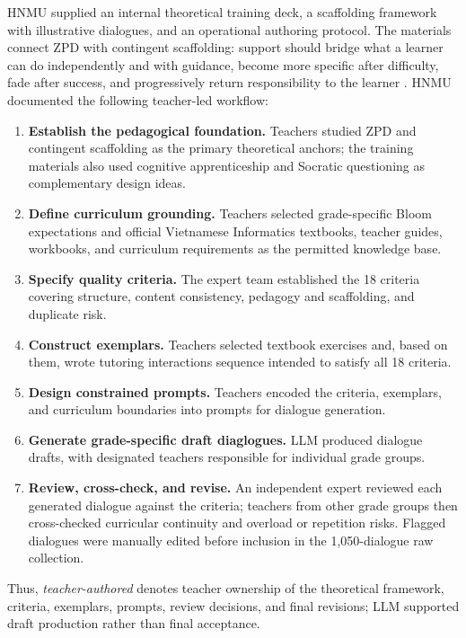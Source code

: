 \documentclass[conference]{IEEEtran}
\begin{document}
HNMU supplied an internal theoretical training deck, a scaffolding framework
with illustrative dialogues, and an operational authoring protocol. The
materials connect ZPD with contingent scaffolding: support should bridge what
a learner can do independently and with guidance, become more specific after
difficulty, fade after success, and progressively return responsibility to the
learner \cite{wood1996vygotsky,wood2001scaffolding}. HNMU documented the
following teacher-led workflow:

\begin{enumerate}
\item \textbf{Establish the pedagogical foundation.} Teachers studied ZPD and
contingent scaffolding as the primary theoretical anchors; the training
materials also used cognitive apprenticeship and Socratic questioning as
complementary design ideas.
\item \textbf{Define curriculum grounding.} Teachers selected grade-specific
Bloom expectations and official Vietnamese Informatics textbooks, teacher
guides, workbooks, and curriculum requirements as the permitted knowledge
base.
\item \textbf{Specify quality criteria.} The expert team established the 18
criteria covering structure, content consistency, pedagogy and scaffolding,
and duplicate risk.
\item \textbf{Construct exemplars.} Teachers selected textbook
exercises and, based on them, wrote tutoring interactions sequence intended to satisfy all 18
criteria.
\item \textbf{Design constrained prompts.} Teachers encoded the criteria,
exemplars, and curriculum boundaries into prompts for dialogue generation.
\item \textbf{Generate grade-specific draft diaglogues.} LLM produced dialogue
drafts, with designated teachers responsible for individual grade groups.
\item \textbf{Review, cross-check, and revise.} An independent expert reviewed
each generated dialogue against the criteria; teachers from other grade groups
then cross-checked curricular continuity and overload or repetition risks.
Flagged dialogues were manually edited before inclusion in the 1,050-dialogue
raw collection.
\end{enumerate}

Thus, \emph{teacher-authored} denotes teacher ownership of the theoretical
framework, criteria, exemplars, prompts, review decisions, and final revisions;
LLM supported draft production rather than final acceptance.
\end{document}
